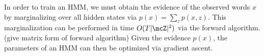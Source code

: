 In order to train an HMM, we must obtain the evidence of the observed words $x$ by marginalizing over all hidden states via $p(x) = \sum_z p(x,z)$.
This marginalization can be performed in time $O(T|\mcZ|^2)$ via the forward algorithm.
(give matrix form of forward algorithm) \citep{jaeger2000}
Given the evidence $p(x)$, the parameters of an HMM can then be optimized via gradient ascent.


